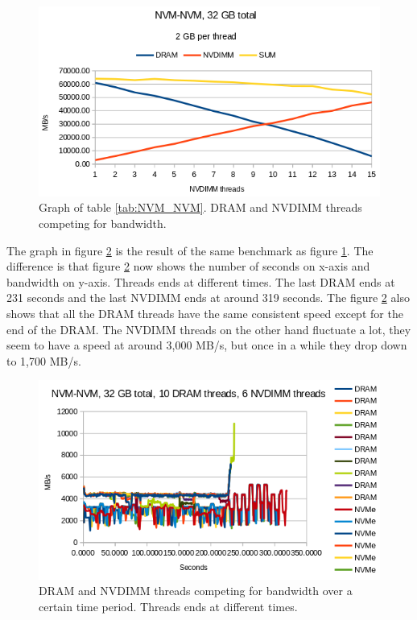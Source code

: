 \documentclass[12pt,a4paper,USenglish]{article}      %
\begin{document}
\begin{figure}[!hbtp]
\includegraphics[scale=0.7]{Benchmarks/NVM-NVM_32GB_Figure.png}
\caption{Graph of table \ref{tab:NVM_NVM}. DRAM and NVDIMM threads competing for bandwidth.}
\label{fig:NVM_NVM}
\end{figure}

The graph in figure \ref{fig:NVM_NVM_sec} is the result of the same benchmark as figure \ref{fig:NVM_NVM}. The difference is that figure \ref{fig:NVM_NVM_sec} now shows the number of seconds on x-axis and bandwidth on y-axis. Threads ends at different times. The last DRAM ends at 231 seconds and the last NVDIMM ends at around 319 seconds. The figure \ref{fig:NVM_NVM_sec} also shows that all the DRAM threads have the same consistent speed except for the end of the DRAM. The NVDIMM threads on the other hand fluctuate a lot, they seem to have a speed at around 3,000 MB/s, but once in a while they drop down to 1,700 MB/s.
\begin{figure}[btp]
\includegraphics[scale=0.7]{Benchmarks/NVM-NVM_32GB_6_Thread.png}
\caption{DRAM and NVDIMM threads competing for bandwidth over a certain time period. Threads ends at different times.}
\label{fig:NVM_NVM_sec}
\end{figure}
\end{document}
